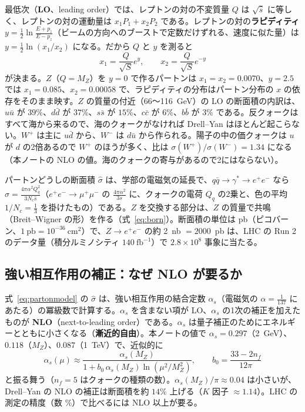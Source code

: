 \documentclass[a4paper,10pt]{ltjsarticle}
\begin{document}
最低次（\textbf{LO}、leading order）では、レプトンの対の不変質量 $Q$ は $\sqrt{\hat s}$ に等しく、レプトンの対の運動量は $x_1P_1+x_2P_2$ である。レプトンの対の\textbf{ラピディティ} $y=\frac12\ln\frac{E+p_z}{E-p_z}$（ビームの方向へのブーストで定数だけずれる、速度に似た量）は $y=\frac12\ln(x_1/x_2)$ になる。だから $Q$ と $y$ を測ると
\[
x_1=\frac Q{\sqrt S}e^{y},\qquad x_2=\frac Q{\sqrt S}e^{-y}
\]
が決まる。$Z$（$Q=M_Z$）を $y=0$ で作るパートンは $x_1=x_2=0.0070$、$y=2.5$ では $x_1=0.085$、$x_2=0.00058$ で、ラピディティの分布はパートン分布の $x$ の依存をそのまま映す。$Z$ の質量の付近（66〜116~GeV）の LO の断面積の内訳は、$u\bar u$ が $39\%$、$d\bar d$ が $37\%$、$s\bar s$ が $15\%$、$c\bar c$ が $6\%$、$b\bar b$ が $3\%$ である。反クォークはすべて海から来るので、海のクォークがなければ Drell--Yan はほとんど起こらない。$W^+$ は主に $u\bar d$ から、$W^-$ は $d\bar u$ から作られる。陽子の中の価クォークは $u$ が $d$ の2倍あるので $W^+$ のほうが多く、比は $\sigma(W^+)/\sigma(W^-)=1.34$ になる（本ノートの NLO の値。海のクォークの寄与があるので2にはならない）。

パートンどうしの断面積 $\hat\sigma$ は、学部の電磁気の延長で、$q\bar q\to\gamma^*\to e^+e^-$ なら $\hat\sigma=\frac{4\pi\alpha^2Q_q^2}{3N_c\hat s}$（$e^+e^-\to\mu^+\mu^-$ の $\frac{4\pi\alpha^2}{3s}$ に、クォークの電荷 $Q_q$ の2乗と、色の平均 $1/N_c=\frac13$ を掛けたもの）である。$Z$ を交換する部分は、$Z$ の質量で共鳴（Breit--Wigner の形）を作る（式~\eqref{eq:born}）。断面積の単位は pb（ピコバーン、$1~\mathrm{pb}=10^{-36}~\mathrm{cm}^2$）で、$Z\to e^+e^-$ の約 2~nb $=2000$~pb は、LHC の Run 2 のデータ量（積分ルミノシティ $140~\mathrm{fb}^{-1}$）で $2.8\times10^8$ 事象に当たる。

\subsection{強い相互作用の補正：なぜ NLO が要るか}\label{sec:whynlo}

式~\eqref{eq:partonmodel} の $\hat\sigma$ は、強い相互作用の結合定数 $\alpha_s$（電磁気の $\alpha=\frac1{137}$ にあたる）の冪級数で計算する。$\alpha_s$ を含まない項が LO、$\alpha_s$ の1次の補正を加えたものが \textbf{NLO}（next-to-leading order）である。$\alpha_s$ は量子補正のためにエネルギーとともに小さくなる（\textbf{漸近的自由}）。本ノートの値で $\alpha_s=0.297$（2~GeV）、$0.118$（$M_Z$）、$0.087$（1~TeV）で、近似的に
\[
\alpha_s(\mu)\approx\frac{\alpha_s(M_Z)}{1+b_0\,\alpha_s(M_Z)\ln(\mu^2/M_Z^2)},\qquad b_0=\frac{33-2n_f}{12\pi}
\]
と振る舞う（$n_f=5$ はクォークの種類の数）。$\alpha_s(M_Z)/\pi\approx0.04$ は小さいが、Drell--Yan の NLO の補正は断面積を約 $14\%$ 上げる（$K$ 因子 $\approx1.14$）。LHC の測定の精度（数 $\%$）で比べるには NLO 以上が要る。
\end{document}
